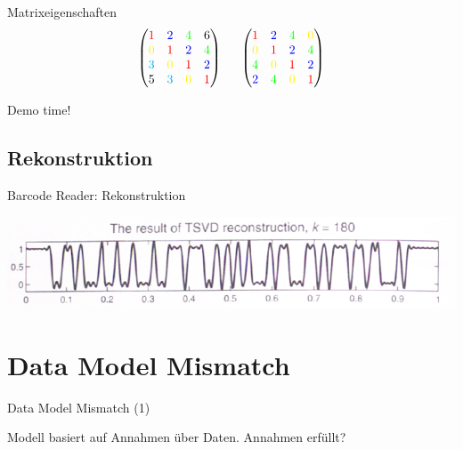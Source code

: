 \documentclass[11pt]{beamer}
\begin{document}
\begin{frame}{Matrixeigenschaften}
\[
\begin{pmatrix}
{\color{red}    1} & {\color{blue}   2} & {\color{green}  4} &                6 \\
{\color{yellow} 0} & {\color{red}    1} & {\color{blue}   2} & {\color{green} 4}\\
{\color{cyan}   3} & {\color{yellow} 0} & {\color{red}    1} & {\color{blue}  2}\\
                5  & {\color{cyan}   3} & {\color{yellow} 0} & {\color{red}   1}\\
\end{pmatrix}
\,\,\,\,\,\,\,\,\,
\begin{pmatrix}
{\color{red}    1} & {\color{blue}   2} & {\color{green}  4} & {\color{yellow} 0}\\
{\color{yellow} 0} & {\color{red}    1} & {\color{blue}   2} & {\color{green}  4}\\
{\color{green}  4} & {\color{yellow} 0} & {\color{red}    1} & {\color{blue}   2}\\
{\color{blue}   2} & {\color{green}  4} & {\color{yellow} 0} & {\color{red}    1}\\
\end{pmatrix}
\]
\end{frame}


\begin{frame}
\begin{center}
Demo time!
\end{center}
\end{frame}


\subsection{Rekonstruktion}
\begin{frame}{Barcode Reader: Rekonstruktion}
\begin{center}
\includegraphics[scale=0.5]{Barcode_TSVD.PNG} 
\end{center}
\end{frame}


\section{Data Model Mismatch}
\begin{frame}{Data Model Mismatch (1)}

Modell basiert auf Annahmen über Daten. Annahmen erfüllt?

\end{frame}
\end{document}
